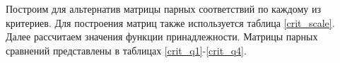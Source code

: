 Построим для альтернатив матрицы парных соответствий по каждому из критериев. 
Для построения матриц также используется таблица \ref{crit_scale}. 
Далее рассчитаем значения функции принадлежности.
Матрицы парных сравнений представлены в таблицах \ref{crit_q1}-\ref{crit_q4}.




